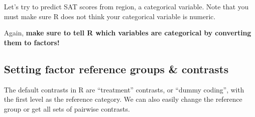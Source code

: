 \documentclass[
]{book}
\newenvironment{Shaded}{\begin{snugshade}}{\end{snugshade}}
\newcommand{\CommentTok}[1]{\textcolor[rgb]{0.56,0.35,0.01}{\textit{#1}}}
\newcommand{\DataTypeTok}[1]{\textcolor[rgb]{0.13,0.29,0.53}{#1}}
\newcommand{\DecValTok}[1]{\textcolor[rgb]{0.00,0.00,0.81}{#1}}
\newcommand{\KeywordTok}[1]{\textcolor[rgb]{0.13,0.29,0.53}{\textbf{#1}}}
\newcommand{\NormalTok}[1]{#1}
\newcommand{\OperatorTok}[1]{\textcolor[rgb]{0.81,0.36,0.00}{\textbf{#1}}}
\newcommand{\StringTok}[1]{\textcolor[rgb]{0.31,0.60,0.02}{#1}}
\begin{document}
Let's try to predict SAT scores from region, a categorical variable.
Note that you must make sure R does not think your categorical variable is numeric.

\begin{Shaded}
\end{Shaded}

\begin{Shaded}
\end{Shaded}

Again, \textbf{make sure to tell R which variables are categorical by converting them to factors!}

\hypertarget{setting-factor-reference-groups-contrasts}{%
\subsection{Setting factor reference groups \& contrasts}\label{setting-factor-reference-groups-contrasts}}

The default contrasts in R are ``treatment'' contrasts, or ``dummy coding'', with the first level as the reference category.
We can also easily change the reference group or get all sets of pairwise contrasts.
\end{document}
